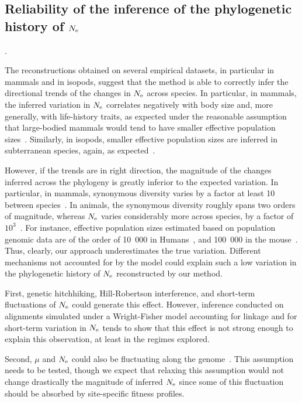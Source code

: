 \subsection{Reliability of the inference of the phylogenetic history of \texorpdfstring{$N_{\text{e}}$}{Nₑ}}.

The reconstructions obtained on several empirical datasets, in particular in mammals and in isopods, suggest that the method is able to correctly infer the directional trends of the changes in $N_{\text{e}}$ across species.
In particular, in mammals, the inferred variation in $N_{\text{e}}$ correlates negatively with body size and, more generally, with life-history traits, as expected under the reasonable assumption that large-bodied mammals would tend to have smaller effective population sizes~\cite{Popadin2007,Lartillot2012,Nabholz2013,Figuet2017}.
Similarly, in isopods, smaller effective population sizes are inferred in subterranean species, again, as expected~\citep{Capderrey2013}.

However, if the trends are in right direction, the magnitude of the changes inferred across the phylogeny is greatly inferior to the expected variation.
In particular, in mammals, synonymous diversity varies by a factor at least 10 between species~\citep{Galtier2016}.
In animals, the synonymous diversity roughly spans two orders of magnitude, whereas $N_{\text{e}}$ varies considerably more across species, by a factor of $10^3$~\citep{Galtier2019}.
For instance, effective population sizes estimated based on population genomic data are of the order of 10~000 in Humans~\citep{Li2011}, and 100~000 in the mouse~\citep{Geraldes2008}.
Thus, clearly, our approach underestimates the true variation.
Different mechanisms not accounted for by the model could explain such a low variation in the phylogenetic history of $N_{\text{e}}$ reconstructed by our method.

First, genetic hitchhiking, Hill-Robertson interference, and short-term fluctuations of $N_{\text{e}}$ could generate this effect.
However, inference conducted on alignments simulated under a Wright-Fisher model accounting for linkage and for short-term variation in $N_{\text{e}}$ tends to show that this effect is not strong enough to explain this observation, at least in the regimes explored.

Second, $\mu$ and $N_{\text{e}}$ could also be fluctuating along the genome~\citep{Gossmann2011,Ellegren2003,Eyre-Walker2014}.
This assumption needs to be tested, though we expect that relaxing this assumption would not change drastically the magnitude of inferred $N_{\text{e}}$ since some of this fluctuation should be absorbed by site-specific fitness profiles.

